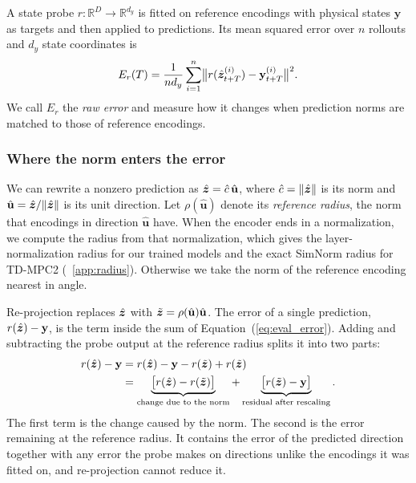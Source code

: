 A state probe $r:\mathbb R^D\to\mathbb R^{d_y}$ is fitted on reference encodings with physical states $\mathbf y$ as targets and then applied to predictions. Its mean squared error over $n$ rollouts and $d_y$ state coordinates is
\begin{equation}
E_r(T)=\frac{1}{n d_y}\sum_{i=1}^{n}
\bigl\|r(\hat{\bm{z}}^{(i)}_{t+T})-\mathbf{y}^{(i)}_{t+T}\bigr\|^2 .
\label{eq:eval_error}
\end{equation}
We call $E_r$ the \emph{raw error} and measure how it changes when prediction norms are matched to those of reference encodings.

\subsubsection{Where the norm enters the error}
\label{sec:split}
We can rewrite a nonzero prediction as $\hat{\bm{z}}=\hat c\,\hat{\mathbf u}$, where $\hat c=\|\hat{\bm{z}}\|$ is its norm and $\hat{\mathbf u}=\hat{\bm{z}}/\|\hat{\bm{z}}\|$ is its unit direction. Let $\rho(\hat{\mathbf u})$ denote its \emph{reference radius}, the norm that encodings in direction $\hat{\mathbf u}$ have. When the encoder ends in a normalization, we compute the radius from that normalization, which gives the layer-normalization radius for our trained models and the exact SimNorm radius for TD-MPC2 (\supsec~\ref{app:radius}). Otherwise we take the norm of the reference encoding nearest in angle.

Re-projection replaces $\hat{\bm{z}}$ with $\tilde{\bm{z}}=\rho(\hat{\mathbf u})\hat{\mathbf u}$. The error of a single prediction, $r(\hat{\bm{z}})-\mathbf y$, is the term inside the sum of Equation~(\ref{eq:eval_error}). Adding and subtracting the probe output at the reference radius splits it into two parts:
\begin{equation}
\begin{aligned}
r(\hat{\bm{z}})-\mathbf y &= r(\hat{\bm{z}})-\mathbf y-r(\tilde{\bm{z}})+r(\tilde{\bm{z}}) \\
&=\underbrace{\bigl[r(\hat{\bm{z}})-r(\tilde{\bm{z}})\bigr]}_{\text{change due to the norm}}+\underbrace{\bigl[r(\tilde{\bm{z}})-\mathbf y\bigr]}_{\text{residual after rescaling}} .
\end{aligned}
\label{eq:probe_composition}
\end{equation}
The first term is the change caused by the norm. The second is the error remaining at the reference radius. It contains the error of the predicted direction together with any error the probe makes on directions unlike the encodings it was fitted on, and re-projection cannot reduce it.

